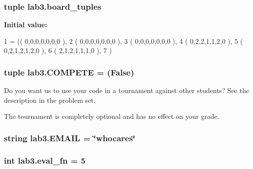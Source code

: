 \subsubsection[{board\+\_\+tuples}]{\setlength{\rightskip}{0pt plus 5cm}tuple lab3.\+board\+\_\+tuples}\label{namespacelab3_af72a06890c8de2fae05fc82044aa76be}
{\bfseries Initial value\+:}
\begin{DoxyCode}
1 = (( 0,0,0,0,0,0,0 ),
2                     ( 0,0,0,0,0,0,0 ),
3                     ( 0,0,0,0,0,0,0 ),
4                     ( 0,2,2,1,1,2,0 ),
5                     ( 0,2,1,2,1,2,0 ),
6                     ( 2,1,2,1,1,1,0 ),
7                     )
\end{DoxyCode}
\hypertarget{namespacelab3_a507ef68d63a202cdd769b53df79cf163}{}
\subsubsection[{C\+O\+M\+P\+E\+T\+E}]{\setlength{\rightskip}{0pt plus 5cm}tuple lab3.\+C\+O\+M\+P\+E\+T\+E = (False)}\label{namespacelab3_a507ef68d63a202cdd769b53df79cf163}


Do you want us to use your code in a tournament against other students? See the description in the problem set. 

The tournament is completely optional and has no effect on your grade. \hypertarget{namespacelab3_a3cd2b5e83c71f1b3c2f453bea62b3af5}{}
\subsubsection[{E\+M\+A\+I\+L}]{\setlength{\rightskip}{0pt plus 5cm}string lab3.\+E\+M\+A\+I\+L = \char`\"{}whocares\char`\"{}}\label{namespacelab3_a3cd2b5e83c71f1b3c2f453bea62b3af5}
\hypertarget{namespacelab3_aef5722d14d422222f997cff6cd66564f}{}
\subsubsection[{eval\+\_\+fn}]{\setlength{\rightskip}{0pt plus 5cm}int lab3.\+eval\+\_\+fn = 5}\label{namespacelab3_aef5722d14d422222f997cff6cd66564f}
\hypertarget{namespacelab3_ac15f588150b4ba8f99f8b305c86527cc}{}
